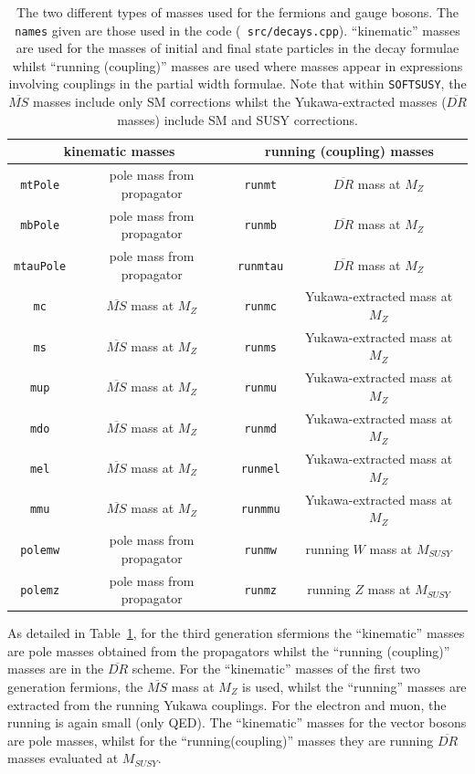 \documentclass[final,3p,times,pdflatex]{elsarticle}
\begin{document}
\begin{center}
\begin{table}
\centering
\begin{tabular}{|c|c|c|c|} \hline
\multicolumn{2}{|c|}{kinematic masses} & \multicolumn{2}{c|}{running (coupling) masses} \\ \hline
 {\tt mtPole} & pole mass from propagator & {\tt runmt} & $\overline{DR}$ mass at $M_Z$ \\ \hline
 {\tt mbPole} & pole mass from propagator & {\tt runmb} & $\overline{DR}$ mass at $M_Z$ \\ \hline 
 {\tt mtauPole} & pole mass from propagator & {\tt runmtau} & $\overline{DR}$ mass at $M_Z$\\ \hline
 {\tt mc} & $\overline{MS}$ mass at $M_Z$ & {\tt runmc} & Yukawa-extracted mass at $M_Z$ \\ \hline
 {\tt ms} & $\overline{MS}$ mass at $M_Z$ & {\tt runms} & Yukawa-extracted mass at $M_Z$ \\ \hline
 {\tt mup} & $\overline{MS}$ mass at $M_Z$ & {\tt runmu} & Yukawa-extracted mass at $M_Z$ \\ \hline
 {\tt mdo} & $\overline{MS}$ mass at $M_Z$ & {\tt runmd} & Yukawa-extracted mass at $M_Z$ \\ \hline
 {\tt mel} & $\overline{MS}$ mass at $M_Z$ & {\tt runmel} & Yukawa-extracted mass at $M_Z$ \\ \hline
 {\tt mmu} & $\overline{MS}$ mass at $M_Z$ & {\tt runmmu} & Yukawa-extracted mass at $M_Z$ \\ \hline
 {\tt polemw} & pole mass from propagator & {\tt runmw} & running $W$ mass at $M_{SUSY}$ \\ \hline
 {\tt polemz} & pole mass from propagator & {\tt runmz} & running $Z$ mass at $M_{SUSY}$ \\ \hline
\end{tabular}
\caption{The two different types of masses used for the fermions and gauge
  bosons. The {\tt names} given are those used in the code ({\tt
    src/decays.cpp}). ``kinematic'' masses are used for the masses of initial
  and final state particles in the decay formulae whilst ``running
  (coupling)'' masses are used where masses appear in expressions involving
  couplings in the partial 
  width formulae. Note that within {\tt SOFTSUSY}, the $\overline{MS}$ masses
  include 
  only SM corrections whilst the Yukawa-extracted masses ($\overline{DR}$
  masses) include SM and SUSY corrections.} 
\label{massestable}
\end{table}
\end{center}
As detailed in Table~\ref{massestable}, for the third generation sfermions the ``kinematic'' masses are pole
masses obtained from the propagators whilst
the ``running (coupling)'' masses are in the $\overline{DR}$ scheme. For the
``kinematic'' masses of the first two generation fermions, the $\overline{MS}$
mass at $M_Z$ is used, whilst the ``running'' masses are extracted from the
running Yukawa couplings. For the electron and muon, the running is again
small (only QED). The ``kinematic'' masses for the vector bosons are pole
masses, whilst for the ``running(coupling)'' masses they are running
$\overline{DR}$ masses evaluated at $M_{SUSY}$. 
\end{document}
